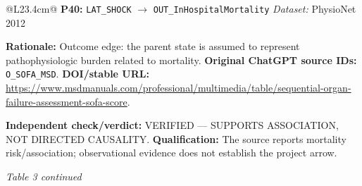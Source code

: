 \begin{tabular}{@{}L{23.4cm}@{}}
\addlinespace[2pt]
\midrule
\textbf{P40:} \nolinkurl{LAT_SHOCK} $\rightarrow$ \nolinkurl{OUT_InHospitalMortality} \hfill \textit{Dataset:} PhysioNet 2012\par\textbf{Rationale:} Outcome edge: the parent state is assumed to represent pathophysiologic burden related to mortality. \textbf{Original ChatGPT source IDs:} \nolinkurl{O_SOFA_MSD}. \textbf{DOI/stable URL:} \url{https://www.msdmanuals.com/professional/multimedia/table/sequential-organ-failure-assessment-sofa-score}.\par\textbf{Independent check/verdict:} VERIFIED --- SUPPORTS ASSOCIATION, NOT DIRECTED CAUSALITY. \textbf{Qualification:} The source reports mortality risk/association; observational evidence does not establish the project arrow. \\
\addlinespace[2pt]
\midrule
\bottomrule
\end{tabular}
\clearpage
\textit{Table 3 continued}\par
